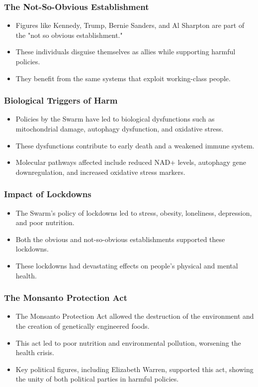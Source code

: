 \begin{frame}[fragile]\frametitle{The Not-So-Obvious Establishment}
      \begin{itemize}
          \item Figures like Kennedy, Trump, Bernie Sanders, and Al Sharpton are part of the "not so obvious establishment."
          \item These individuals disguise themselves as allies while supporting harmful policies.
          \item They benefit from the same systems that exploit working-class people.
      \end{itemize}
\end{frame}

\begin{frame}[fragile]\frametitle{Biological Triggers of Harm}
      \begin{itemize}
          \item Policies by the Swarm have led to biological dysfunctions such as mitochondrial damage, autophagy dysfunction, and oxidative stress.
          \item These dysfunctions contribute to early death and a weakened immune system.
          \item Molecular pathways affected include reduced NAD+ levels, autophagy gene downregulation, and increased oxidative stress markers.
      \end{itemize}
\end{frame}

\begin{frame}[fragile]\frametitle{Impact of Lockdowns}
      \begin{itemize}
          \item The Swarm’s policy of lockdowns led to stress, obesity, loneliness, depression, and poor nutrition.
          \item Both the obvious and not-so-obvious establishments supported these lockdowns.
          \item These lockdowns had devastating effects on people's physical and mental health.
      \end{itemize}
\end{frame}

\begin{frame}[fragile]\frametitle{The Monsanto Protection Act}
      \begin{itemize}
          \item The Monsanto Protection Act allowed the destruction of the environment and the creation of genetically engineered foods.
          \item This act led to poor nutrition and environmental pollution, worsening the health crisis.
          \item Key political figures, including Elizabeth Warren, supported this act, showing the unity of both political parties in harmful policies.
      \end{itemize}
\end{frame}

